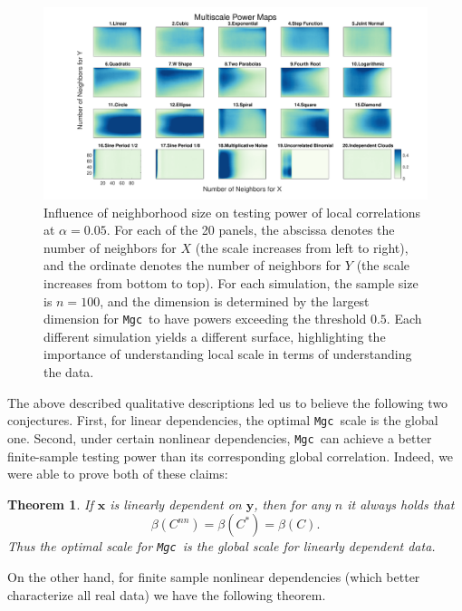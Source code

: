 \documentclass[11pt]{article}
\providecommand{\sct}[1]{{\sc \texttt{#1}}}
\providecommand{\mb}[1]{\boldsymbol{#1}}
\newcommand{\G}{C}
\newcommand{\Mgc}{\sct{Mgc}}
\newtheorem{thm}{Theorem}
\begin{document}
\begin{figure}[htbp]
\includegraphics[width=1.0\textwidth]{../Figures/FigHDHeat}
\caption{Influence of neighborhood size on testing power of local correlations at $\alpha=0.05$.
For each of the 20 panels, the abscissa denotes the number of neighbors for $X$ (the scale increases from left to right), and the ordinate denotes the number of neighbors for $Y$ (the scale increases from bottom to top). For each simulation, the sample size is $n=100$, and the dimension is determined by the largest dimension for \Mgc~to have powers exceeding the threshold $0.5$. Each different simulation yields a different surface, highlighting the importance of understanding local scale in terms of understanding the data. }
\label{f:powermaps}
\end{figure}

The above described qualitative descriptions led us to believe the following two conjectures.  First, for linear dependencies,  the optimal \Mgc~scale is the global one. Second, under certain nonlinear dependencies, \Mgc~can achieve a better finite-sample testing power than its corresponding global correlation. Indeed, we were able to prove both of these claims:

\begin{thm}
\label{t:linear}
If $\mb{x}$ is linearly dependent on $\mb{y}$, then for any $n$ it always holds that
\begin{equation}
\beta(\G^{nn}) = \beta(\G^{*}) = \beta(\G).
\end{equation}
Thus the optimal scale for \Mgc~is the global scale for linearly dependent data.
\end{thm}

On the other hand, for finite sample nonlinear dependencies (which better characterize all real data) we have the following theorem.
\end{document}
